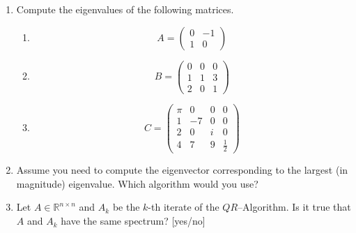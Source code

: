 \vspace*{-0.5cm}
\begin{enumerate}
\item Compute the eigenvalues of the following matrices.

\begin{enumerate}
	\item 
	$$
	A = \begin{pmatrix}
	0&-1\\
	1&0
	\end{pmatrix}
	$$
	\item
	$$
	B = \begin{pmatrix}
	0&0&0\\
	1&1&3\\
	2&0&1
	\end{pmatrix}
	$$
	\item 
	$$C=
	\begin{pmatrix}
	\pi& 0& 0&0\\
	1 & -7&  0&0\\
	2 & 0& i   &0\\
	4 & 7& 9& \frac{1}{2}
	\end{pmatrix}
	$$
\end{enumerate}
\item Assume you need to compute the eigenvector corresponding to the largest (in magnitude) eigenvalue. Which algorithm would you use?
\item Let $A\in\mathbb{R}^{n \times n}$ and $A_k$ be the $k$-th iterate of the $QR$--Algorithm. Is it true that $A$ and $A_k$ have the same spectrum? [yes/no]%
%
%

\end{enumerate}
